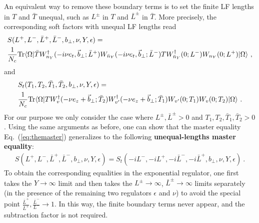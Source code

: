 \documentclass[a4paper,11pt]{article}
\begin{document}
An equivalent way to remove these boundary terms is to set the finite LF lengths in $T$ and $\bar T$ unequal, such as $L^{\pm}$ in $T$ and $
\bar L^{\pm}$ in $\bar T$. More precisely, the corresponding soft factors with unequal LF lengths read
\begin{align}\label{eq:Sunequal}
&S(L^+,L^-,\bar L^+, \bar L^-, b_\perp, \nu, Y,\epsilon)=\nonumber \\
&\frac{1}{N_c}{\rm Tr}\langle \Omega|\bar{T} W_{n_Y}^{\dagger}(-i\nu e_t,\vec{b}_\perp;\bar L^+)W_{\bar n_Y}(-i\nu e_t,\vec{b}_\perp;\bar L^-)TW_{\bar n_Y}^{\dagger}(0;L^-)W_{n_Y}(0;L^+)|\Omega\rangle \ ,
\end{align}
and 
\begin{align}\label{eq:Sunequal}
&S_t(T_1,T_2, \bar T_1,\bar T_2,b_\perp,\nu,Y,\epsilon)=\nonumber \\
&\frac{1}{N_c}{\rm Tr}\langle \Omega|TW^{\dagger}_{v}(-\nu e_z+\vec{b}_\perp;\bar T_2)W^{\dagger}_{v'}(-\nu e_z+\vec{b}_\perp;\bar T_1)W_{v'}(0;T_1)W_{v}(0;T_2)|\Omega \rangle \ .
\end{align}
For our purpose we only consider the case where $L^{\pm}, \bar L^{\pm}>0$ and $T_1,T_2,\bar T_1,\bar T_2>0$.
Using the same arguments as before, one can show that the master equality Eq.~(\ref{eq:themaster}) generalizes to the following {\bf unequal-lengths master equality}:
\begin{align}\label{eq:unequalmaster}
S(L^+,L^-,\bar L^+, \bar L^-, b_\perp, \nu, Y,\epsilon)=S_t(-iL^-,-iL^+,-i\bar L^-,-i\bar L^+,b_\perp,\nu,Y,\epsilon) \ .
\end{align}
To obtain the corresponding equalities in the exponential regulator, one first takes the $Y\rightarrow \infty$ limit and then takes the $L^{\pm} \rightarrow \infty$, $\bar L^{\pm} \rightarrow \infty$ limits separately (in the presence of the remaining two regulators $\epsilon$ and $\nu$) to avoid the special point $\frac{\bar L^{+}}{L^+}, \frac{\bar L^-}{L^-} \rightarrow 1$. In this way, the finite boundary terms never appear, and the subtraction factor is not required. 
\end{document}
